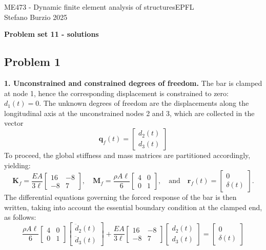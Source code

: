 \documentclass[12pt]{article}
\begin{document}
\noindent ME473 - Dynamic finite element analysis of structures\hfill EPFL\\
Stefano Burzio \hfill 2025\\
\vspace{0.3cm}

\hspace*{\fill}\textbf{\Large Problem set 11 - solutions}\hspace*{\fill}

\hrulefill

\subsection*{Problem 1}
\textbf{1. Unconstrained and constrained degrees of freedom.} The bar is clamped at node 1, hence the corresponding displacement is constrained to zero: $d_1(t) = 0$. The unknown degrees of freedom are the displacements along the longitudinal axis at the unconstrained nodes 2 and 3, which are collected in the vector
\[
    \mathbf q_f(t) = \begin{bmatrix} d_2(t) \\ d_3(t) \end{bmatrix}
\]
To proceed, the global stiffness and mass matrices are partitioned accordingly, yielding:
\[
    \mathbf{K}_f = \frac{EA}{3\ell}
    \begin{bmatrix}
        16 & -8 \\
        -8 & 7
    \end{bmatrix}, \quad
    \mathbf{M}_f = \frac{\rho A \ell}{6}
    \begin{bmatrix}
        4 & 0 \\
        0 & 1
    \end{bmatrix}, \quad\text{and}\quad
    \mathbf r_f(t) = \begin{bmatrix} 0 \\ \delta(t) \end{bmatrix}.
\]
The differential equations governing the forced response of the bar is then written, taking into account the essential boundary condition at the clamped end, as follows:
\[
    \frac{\rho A \ell}{6}
    \begin{bmatrix}
        4 & 0 \\
        0 & 1
    \end{bmatrix} \begin{bmatrix} \ddot{d}_2(t) \\ \ddot{d}_3(t) \end{bmatrix}
    + \frac{EA}{3\ell}
    \begin{bmatrix}
        16 & -8 \\
        -8 & 7
    \end{bmatrix} \begin{bmatrix} d_2(t) \\ d_3(t) \end{bmatrix}
    = \begin{bmatrix} 0 \\ \delta(t) \end{bmatrix}
\]
\end{document}

